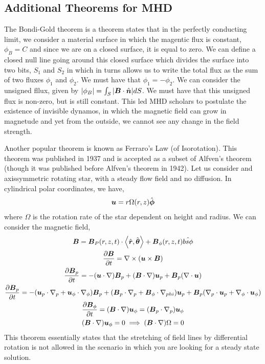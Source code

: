 \documentclass{article}
\begin{document}
\subsection{Additional Theorems for MHD}

The Bondi-Gold theorem is a theorem states that in the perfectly conducting
limit, we consider a material surface in which the magentic flux is constant,
$\phi_B = C$ and since we are on a closed surface, it is equal to zero. 
We can define a closed null line going around this closed surface which divides
the surface into two bits, $S_1$ and $S_2$ in which in turns allows us to write
the total flux as the sum of two fluxes $\phi_1$ and $\phi_2$. We must have that
$\phi_1 = - \phi_2$. We can consider the unsigned fllux, given by $|\phi_B| =
\int_S |\boldsymbol{B}\cdot\hat{\boldsymbol{n}}| dS$. We must have that this unsigned flux is non-zero, but
is still constant. This led MHD scholars to postulate the existence of invisible
dynamos, in which the magnetic field can grow in magnetude and yet from the
outside, we cannot see any change in the field strength. 


Another popular theorem is known as Ferraro's Law (of Isorotation). This theorem
was published in 1937 and is accepted as a subset of Alfven's theorem (though it
was published before Alfven's theorem in 1942). Let us consider and
axissymmetric rotating star, with a steady flow field and no diffusion. In
cylindrical polar coordinates, we have, 
\begin{gather*}
    \boldsymbol{u} = r\Omega(r, z)\hat{\boldsymbol{\phi}}
\end{gather*}
where $\Omega$ is the rotation rate of the star dependent on height and radius.
We can consider the magnetic field, 
\begin{gather*}
    \boldsymbol{B} = \boldsymbol{B}_P (r, z, t) \cdot \left<\hat{\boldsymbol{r}}, \hat{\boldsymbol{\theta}}\right> +
    \boldsymbol{B}_{\phi} (r, z, t) \hat{bs{\phi}}\\
    \frac{\partial \boldsymbol{B}}{\partial t} = \nabla\times(\boldsymbol{u}\times\boldsymbol{B})\\
    \frac{\partial \boldsymbol{B}_p}{\partial t} = -(\boldsymbol{u}\cdot\nabla)\boldsymbol{B}_p + (\boldsymbol{B}\cdot\nabla)\boldsymbol{u}_p + \boldsymbol{B}_p(\nabla \cdot{\boldsymbol{u}})\\
    \frac{\partial \boldsymbol{B}_p}{\partial t} = -(\boldsymbol{u}_p\cdot\nabla_p + \boldsymbol{u}_{\phi} \cdot\nabla_{\phi})\boldsymbol{B}_p +
    (\boldsymbol{B}_p\cdot\nabla_p + \boldsymbol{B}_{\phi}\cdot\nabla_{phi})\boldsymbol{u}_p +
    \boldsymbol{B}_p(\nabla_p\cdot\boldsymbol{u}_p + \nabla_{\phi}\cdot\boldsymbol{u}_{\phi})\\
    \frac{\partial \boldsymbol{B}_{\phi}}{\partial t} = (\boldsymbol{B}\cdot\nabla)\boldsymbol{u}_{\phi} =
    (\boldsymbol{B}_p\cdot\nabla_p)\boldsymbol{u}_{\phi}\\
    (\boldsymbol{B}\cdot\nabla)\boldsymbol{u}_{\phi} = 0 \implies (\boldsymbol{B}\cdot\nabla)\Omega = 0
\end{gather*}
This theorem essentially states that the stretching of field lines by
differential rotation is not allowed in the scenario in which you are looking
for a steady state solution. 
\end{document}
